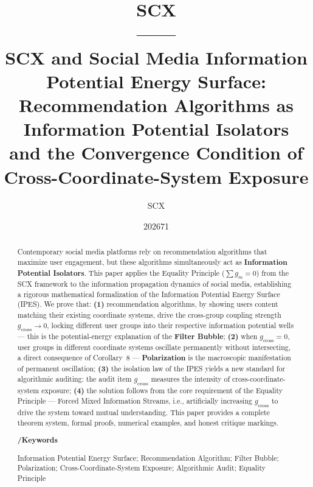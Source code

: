 \documentclass[11pt,a4paper]{article}
\title{\textbf{\LARGE SCX\\[6pt]
——}\\[12pt]
\large SCX and Social Media Information Potential Energy Surface:\\
Recommendation Algorithms as Information Potential Isolators\\
and the Convergence Condition of Cross-Coordinate-System Exposure}
\author{SCX}\\[4pt]
\date{202671}
\theoremstyle{remark}
\newcommand{\GCoupling}{g_{\text{cross}}}
\begin{document}
\maketitle

\begin{abstract}
\noindent
Contemporary social media platforms rely on recommendation algorithms that maximize
user engagement, but these algorithms simultaneously act as \textbf{Information Potential
Isolators}. This paper applies the Equality Principle ($\sum g_m = 0$) from the SCX
framework to the information propagation dynamics of social media, establishing a
rigorous mathematical formalization of the Information Potential Energy Surface (IPES).
We prove that: \textbf{(1)} recommendation algorithms, by showing users content matching
their existing coordinate systems, drive the cross-group coupling strength $\GCoupling \to 0$,
locking different user groups into their respective information potential wells --- this is
the potential-energy explanation of the \textbf{Filter Bubble};
\textbf{(2)} when $\GCoupling = 0$, user groups in different coordinate systems oscillate
permanently without intersecting, a direct consequence of Corollary~8 ---
\textbf{Polarization} is the macroscopic manifestation of permanent oscillation;
\textbf{(3)} the isolation law of the IPES yields a new standard for algorithmic auditing:
the audit item $\GCoupling$ measures the intensity of cross-coordinate-system exposure;
\textbf{(4)} the solution follows from the core requirement of the Equality Principle ---
Forced Mixed Information Streams, i.e., artificially increasing $\GCoupling$ to drive the
system toward mutual understanding. This paper provides a
complete theorem system, formal proofs, numerical examples, and honest critique markings.

\medskip
\noindent\textbf{/Keywords}

\medskip

\noindent
Information Potential Energy Surface; Recommendation Algorithm; Filter Bubble;
Polarization; Cross-Coordinate-System Exposure; Algorithmic Audit; Equality Principle
\end{abstract}

\tableofcontents

\end{document}

